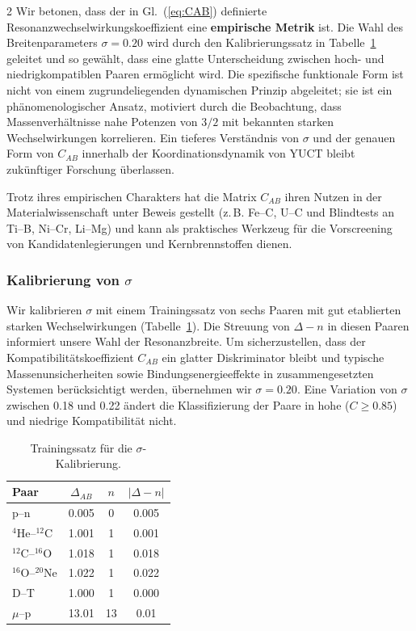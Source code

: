 \documentclass[11pt,a4paper]{article}
\begin{document}
\begin{multicols}{2}
		Wir betonen, dass der in Gl.~(\ref{eq:CAB}) definierte Resonanzwechselwirkungskoeffizient eine \textbf{empirische Metrik} ist. Die Wahl des Breitenparameters \(\sigma = 0.20\) wird durch den Kalibrierungssatz in Tabelle~\ref{tab:calibration} geleitet und so gewählt, dass eine glatte Unterscheidung zwischen hoch- und niedrigkompatiblen Paaren ermöglicht wird. Die spezifische funktionale Form ist nicht von einem zugrundeliegenden dynamischen Prinzip abgeleitet; sie ist ein phänomenologischer Ansatz, motiviert durch die Beobachtung, dass Massenverhältnisse nahe Potenzen von \(3/2\) mit bekannten starken Wechselwirkungen korrelieren. Ein tieferes Verständnis von \(\sigma\) und der genauen Form von \(C_{AB}\) innerhalb der Koordinationsdynamik von YUCT bleibt zukünftiger Forschung überlassen.
		
		Trotz ihres empirischen Charakters hat die Matrix \(C_{AB}\) ihren Nutzen in der Materialwissenschaft unter Beweis gestellt (z. B. Fe–C, U–C und Blindtests an Ti–B, Ni–Cr, Li–Mg) und kann als praktisches Werkzeug für die Vorscreening von Kandidatenlegierungen und Kernbrennstoffen dienen.
		
		\subsubsection{Kalibrierung von \(\sigma\)}
		
		Wir kalibrieren \(\sigma\) mit einem Trainingssatz von sechs Paaren mit gut etablierten starken Wechselwirkungen (Tabelle~\ref{tab:calibration}). Die Streuung von \(\Delta - n\) in diesen Paaren informiert unsere Wahl der Resonanzbreite. Um sicherzustellen, dass der Kompatibilitätskoeffizient \(C_{AB}\) ein glatter Diskriminator bleibt und typische Massenunsicherheiten sowie Bindungsenergieeffekte in zusammengesetzten Systemen berücksichtigt werden, übernehmen wir \(\sigma = 0.20\). Eine Variation von \(\sigma\) zwischen 0.18 und 0.22 ändert die Klassifizierung der Paare in hohe (\(C \ge 0.85\)) und niedrige Kompatibilität nicht.
		
		\begin{table}[H]
			\centering
			\caption{Trainingssatz für die \(\sigma\)-Kalibrierung.}
			\label{tab:calibration}
			\small
			\begin{tabular}{l c c c}
				\toprule
				Paar & \(\Delta_{AB}\) & \(n\) & \(|\Delta - n|\) \\
				\midrule
				p--n    & 0.005 & 0 & 0.005 \\
				\(^4\)He--\(^{12}\)C & 1.001 & 1 & 0.001 \\
				\(^{12}\)C--\(^{16}\)O & 1.018 & 1 & 0.018 \\
				\(^{16}\)O--\(^{20}\)Ne & 1.022 & 1 & 0.022 \\
				D--T    & 1.000 & 1 & 0.000 \\
				\(\mu\)--p & 13.01 & 13 & 0.01 \\
				\bottomrule
			\end{tabular}
		\end{table}
		
	\end{multicols}
	
\end{document}
